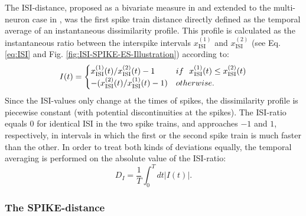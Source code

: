 \documentclass[10pt,twocolumn]{elsart5p}
\begin{document}
The ISI-distance, proposed as a bivariate measure in \citep{Kreuz07c} and extended to the multi-neuron case in \citep{Kreuz09}, was the first spike train distance directly defined as the temporal average of an instantaneous dissimilarity profile. This profile is calculated as the instantaneous ratio between the interspike intervals $x_{\mathrm {ISI}}^{(1)}$ and $x_{\mathrm {ISI}}^{(2)}$ (see Eq. \ref{eq:ISI} and Fig. \ref{fig:ISI-SPIKE-ES-Illustration}) according to:
%
\begin{equation} \label{eq:ISI-Ratio}
    I (t) = \begin{cases}
           x_{\mathrm {ISI}}^{(1)} (t) / x_{\mathrm {ISI}}^{(2)} (t) - 1 & {\rm if} ~~ x_{\mathrm {ISI}}^{(1)} (t) \leq x_{\mathrm {ISI}}^{(2)} (t) \cr
                      - (x_{\mathrm {ISI}}^{(2)} (t) / x_{\mathrm {ISI}}^{(1)} (t) -1)     & {\rm otherwise}.
                  \end{cases}
\end{equation}
%
Since the ISI-values only change at the times of spikes, the dissimilarity profile is piecewise constant (with potential discontinuities at the spikes). The ISI-ratio equals $0$ for identical ISI in the two spike trains, and approaches $-1$ and $1$, respectively, in intervals in which the first or the second spike train is much faster than the other. In order to treat both kinds of deviations equally, the temporal averaging is performed on the absolute value of the ISI-ratio:
%
\begin{equation} \label{eq:Temporal-Average}
    D_I = \frac{1}{T} \int_0^T dt |I (t)|.
\end{equation}


\subsubsection{\label{sss:SPIKE-Distance} The SPIKE-distance}
\end{document}

